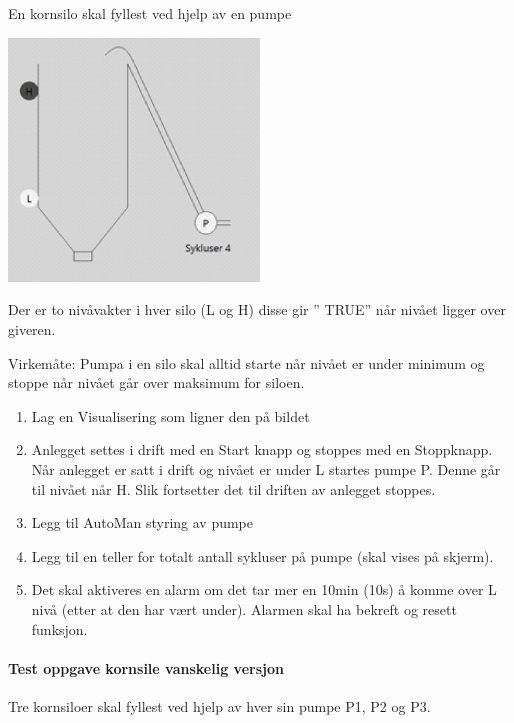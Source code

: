 \documentclass[12pt,a4paper]{article}
\begin{document}
En kornsilo skal fyllest ved hjelp av en pumpe

\includegraphics[width=0.5\textwidth]{i08012x01.png}

Der er to nivåvakter i hver silo (L og H) disse gir \textquotedblright{}
TRUE\textquotedblright{} når nivået ligger over giveren.

Virkemåte: Pumpa i en silo skal alltid starte når nivået er under
minimum og stoppe når nivået går over maksimum for siloen.
\begin{enumerate}
\item Lag en Visualisering som ligner den på bildet
\item Anlegget settes i drift med en Start knapp og stoppes med en Stoppknapp.
Når anlegget er satt i drift og nivået er under L startes pumpe P.
Denne går til nivået når H. Slik fortsetter det til driften av anlegget
stoppes.
\item Legg til AutoMan styring av pumpe
\item Legg til en teller for totalt antall sykluser på pumpe (skal vises
på skjerm). 
\item Det skal aktiveres en alarm om det tar mer en 10min (10s) å komme
over L nivå (etter at den har vært under). Alarmen skal ha bekreft
og resett funksjon.
\end{enumerate}

\paragraph{Test oppgave kornsile vanskelig versjon}

Tre kornsiloer skal fyllest ved hjelp av hver sin pumpe P1, P2 og
P3. 
\end{document}
